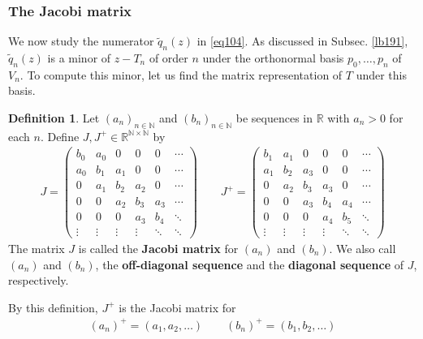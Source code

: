 \documentclass[12pt,b5paper,notitlepage]{article}
\theoremstyle{definition}
\newtheorem{df}{Definition}[section]
\theoremstyle{plain}
\newcommand{\wtd}{\widetilde}
\newcommand{\Nbb}{\mathbb N}
\newcommand{\Rbb}{\mathbb R}
\numberwithin{equation}{section}
\begin{document}
\subsubsection{The Jacobi matrix}






We now study the numerator $\wtd q_n(z)$ in \eqref{eq104}. As discussed in Subsec. \ref{lb191}, $\wtd q_n(z)$ is a minor of $z-T_n$ of order $n$ under the orthonormal basis $p_0,\dots,p_n$ of $V_n$. To compute this minor, let us find the matrix representation of $T$ under this basis.


\begin{df}\label{lb193}
Let $(a_n)_{n\in\Nbb}$ and $(b_n)_{n\in\Nbb}$ be sequences in $\Rbb$ with $a_n>0$ for each $n$. Define $J,J^+\in\Rbb^{\Nbb\times\Nbb}$ by
\begin{align*}
J=\begin{pmatrix}
b_0&a_0&0&0&0&\cdots\\
a_0&b_1&a_1&0&0&\cdots\\
0&a_1&b_2&a_2&0&\cdots\\
0&0&a_2&b_3&a_3&\cdots\\
0&0&0&a_3&b_4&\ddots\\
\vdots&\vdots&\vdots&\vdots&\ddots&\ddots
\end{pmatrix}
\qquad
J^+=\begin{pmatrix}
b_1&a_1&0&0&0&\cdots\\
a_1&b_2&a_3&0&0&\cdots\\
0&a_2&b_3&a_3&0&\cdots\\
0&0&a_3&b_4&a_4&\cdots\\
0&0&0&a_4&b_5&\ddots\\
\vdots&\vdots&\vdots&\vdots&\ddots&\ddots
\end{pmatrix}
\end{align*}
The matrix $J$ is called the \textbf{Jacobi matrix}  for $(a_n)$ and $(b_n)$. We also call $(a_n)$ and $(b_n)$, the \textbf{off-diagonal sequence} and the \textbf{diagonal sequence} of $J$, respectively. 
\end{df}

By this definition, $J^+$ is the Jacobi matrix for
\begin{gather}
(a_n)^+=(a_1,a_2,\dots)\qquad (b_n)^+=(b_1,b_2,\dots)
\end{gather}
\end{document}
